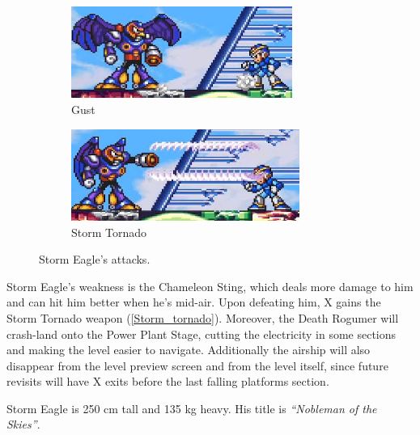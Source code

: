\begin{figure}[htp]
	\ContinuedFloat
	\centering
	\begin{subfigure}{\linewidth}
		\centering
		\includegraphics[height=3cm]{figures/X1/Storm_eagle/Eagle_push.jpg}
		\caption{Gust}
	\end{subfigure}
	\begin{subfigure}{\linewidth}
		\centering
		\includegraphics[height=3cm]{figures/X1/Storm_eagle/Eagle_tornado.jpg}
		\caption{Storm Tornado}
	\end{subfigure}
	\caption{Storm Eagle's attacks.}
\end{figure}

Storm Eagle's weakness is the Chameleon Sting, which deals more damage to him and can hit him better when he's mid-air. Upon defeating him, X gains the Storm Tornado weapon (\ref{Storm_tornado}). Moreover, the Death Rogumer will crash-land onto the Power Plant Stage, cutting the electricity in some sections and making the level easier to navigate. Additionally the airship will also disappear from the level preview screen and from the level itself, since future revisits will have X exits before the last falling platforms section.

Storm Eagle is 250 cm tall and 135 kg heavy. His title is \textit{``Nobleman of the Skies''}. 

